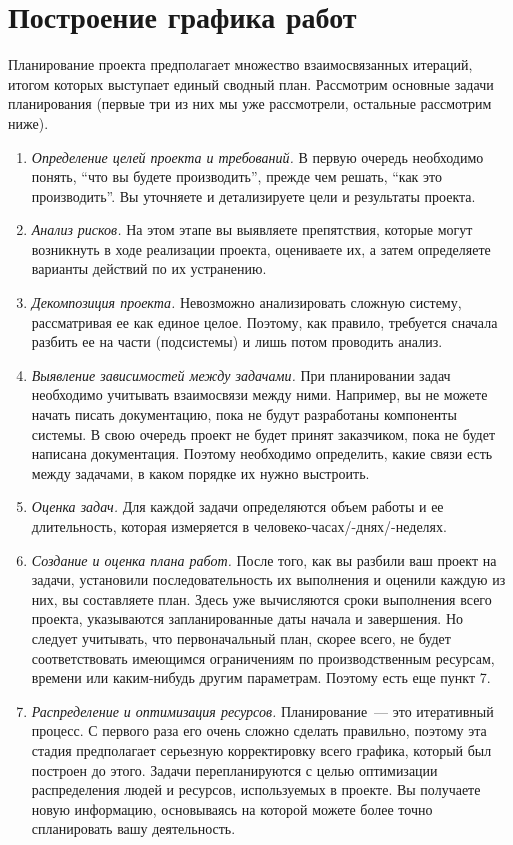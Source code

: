 \documentclass{../../text-style}
\begin{document}
\section{Построение графика работ}

Планирование проекта предполагает множество взаимосвязанных итераций, итогом которых выступает единый сводный план. Рассмотрим основные задачи планирования (первые три из них мы уже рассмотрели, остальные рассмотрим ниже).

\begin{enumerate}
    \item \emph{Определение целей проекта и требований.} В первую очередь необходимо понять, \enquote{что вы будете производить}, прежде чем решать, \enquote{как это производить}. Вы уточняете и детализируете цели и результаты проекта.
    \item \emph{Анализ рисков.} На этом этапе вы выявляете препятствия, которые могут возникнуть в ходе реализации проекта, оцениваете их, а затем определяете варианты действий по их устранению.
    \item \emph{Декомпозиция проекта.} Невозможно анализировать сложную систему, рассматривая ее как единое целое. Поэтому, как правило, требуется сначала разбить ее на части (подсистемы) и лишь потом проводить анализ.
    \item \emph{Выявление зависимостей между задачами.} При планировании задач необходимо учитывать взаимосвязи между ними. Например, вы не можете начать писать документацию, пока не будут разработаны компоненты системы. В свою очередь проект не будет принят заказчиком, пока не будет написана документация. Поэтому необходимо определить, какие связи есть между задачами, в каком порядке их нужно выстроить.
    \item \emph{Оценка задач.} Для каждой задачи определяются объем работы и ее длительность, которая измеряется в человеко-часах/-днях/-неделях.
    \item \emph{Создание и оценка плана работ.} После того, как вы разбили ваш проект на задачи, установили последовательность их выполнения и оценили каждую из них, вы составляете план. Здесь уже вычисляются сроки выполнения всего проекта, указываются запланированные даты начала и завершения. Но следует учитывать, что первоначальный план, скорее всего, не будет соответствовать имеющимся ограничениям по производственным ресурсам, времени или каким-нибудь другим параметрам. Поэтому есть еще пункт 7.
    \item \emph{Распределение и оптимизация ресурсов.} Планирование~--- это итеративный процесс. С первого раза его очень сложно сделать правильно, поэтому эта стадия предполагает серьезную корректировку всего графика, который был построен до этого. Задачи перепланируются с целью оптимизации распределения людей и ресурсов, используемых в проекте. Вы получаете новую информацию, основываясь на которой можете более точно спланировать вашу деятельность.
\end{enumerate}
\end{document}
